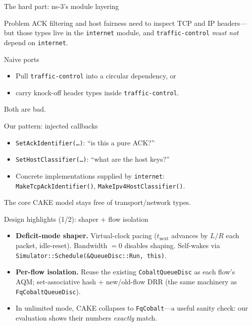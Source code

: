 \documentclass[10pt,aspectratio=169]{beamer}
\begin{document}
\begin{frame}{The hard part: ns-3's module layering}
\begin{block}{Problem}
ACK filtering and host fairness need to inspect TCP and IP headers---but
those types live in the \texttt{internet} module, and
\texttt{traffic-control} \emph{must not} depend on \texttt{internet}.
\end{block}
\begin{block}{Naive ports}
\begin{itemize}
  \item Pull \texttt{traffic-control} into a circular dependency, or
  \item carry knock-off header types inside \texttt{traffic-control}.
\end{itemize}
Both are bad.
\end{block}
\begin{block}{Our pattern: injected callbacks}
\begin{itemize}
  \item \texttt{SetAckIdentifier(\dots)}: ``is this a pure ACK?''
  \item \texttt{SetHostClassifier(\dots)}: ``what are the host keys?''
  \item Concrete implementations supplied by \texttt{internet}:\\
        \texttt{MakeTcpAckIdentifier()}, \texttt{MakeIpv4HostClassifier()}.
\end{itemize}
The core CAKE model stays free of transport/network types.
\end{block}
\end{frame}

\begin{frame}{Design highlights (1/2): shaper + flow isolation}
\begin{itemize}
  \item \textbf{Deficit-mode shaper.} Virtual-clock pacing
        ($t_{\text{next}}$ advances by $L/R$ each packet, idle-reset).
        Bandwidth $=0$ disables shaping. Self-wakes via
        \texttt{Simulator::Schedule(\&QueueDisc::Run, this)}.
  \item \textbf{Per-flow isolation.} Reuse the existing
        \texttt{CobaltQueueDisc} as each flow's AQM; set-associative hash
        + new/old-flow DRR (the same machinery as \texttt{FqCobaltQueueDisc}).
  \item In unlimited mode, CAKE collapses to \texttt{FqCobalt}---a useful
        sanity check: our evaluation shows their numbers \emph{exactly}
        match.
\end{itemize}
\end{frame}
\end{document}
